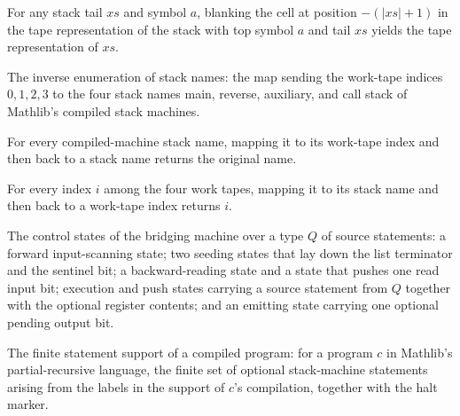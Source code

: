 \begin{lemma}
\label{Turing.bridgeStack_pop}
\leanok
{}
For any stack tail $xs$ and symbol $a$, blanking the cell at position $-(|xs|+1)$ in the
tape representation of the stack with top symbol $a$ and tail $xs$ yields the tape
representation of $xs$.
\end{lemma}

\begin{definition}
\label{Turing.bridgeKey}
\leanok
The inverse enumeration of stack names: the map sending the work-tape indices
$0, 1, 2, 3$ to the four stack names main, reverse, auxiliary, and call stack of
Mathlib's compiled stack machines.
\end{definition}

\begin{lemma}
\label{Turing.bridgeKey_index}
\leanok
{}
For every compiled-machine stack name, mapping it to its work-tape index and then back
to a stack name returns the original name.
\end{lemma}

\begin{lemma}
\label{Turing.bridgeIndex_key}
\leanok
{}
For every index $i$ among the four work tapes, mapping it to its stack name and then
back to a work-tape index returns $i$.
\end{lemma}

\begin{definition}
\label{Turing.BridgeState}
\leanok
The control states of the bridging machine over a type $Q$ of source statements: a
forward input-scanning state; two seeding states that lay down the list terminator
and the sentinel bit; a backward-reading state and a state that pushes one read
input bit; execution and push states carrying a source statement from $Q$ together
with the optional register contents; and an emitting state carrying one optional
pending output bit.
\end{definition}

\begin{definition}
\label{Turing.bridgeSupp}
\leanok
The finite statement support of a compiled program: for a program $c$ in Mathlib's
partial-recursive language, the finite set of optional stack-machine statements
arising from the labels in the support of $c$'s compilation, together with the halt
marker.
\end{definition}

